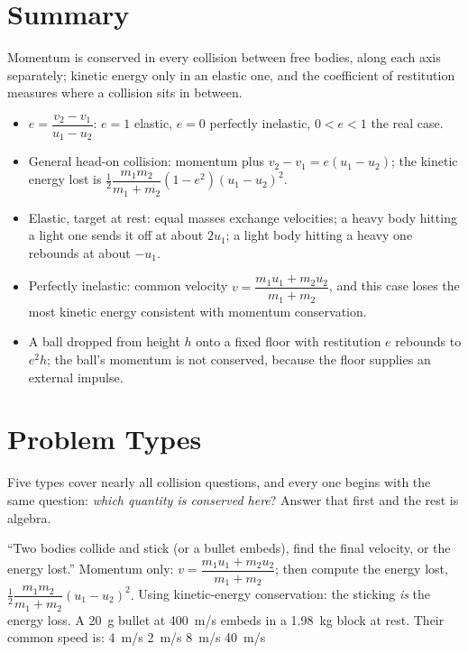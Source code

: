 \section{Summary}\label{sec:summary12}
Momentum is conserved in every collision between free bodies, along each axis separately; kinetic energy
only in an elastic one, and the coefficient of restitution measures where a collision sits in between.

\begin{itemize}
\item $e=\dfrac{v_2-v_1}{u_1-u_2}$: $e=1$ elastic, $e=0$ perfectly inelastic, $0<e<1$ the real case.
\item General head-on collision: momentum plus $v_2-v_1=e(u_1-u_2)$; the kinetic energy lost is
      $\tfrac12\dfrac{m_1m_2}{m_1+m_2}(1-e^2)(u_1-u_2)^2$.
\item Elastic, target at rest: equal masses exchange velocities; a heavy body hitting a light one sends it off
      at about $2u_1$; a light body hitting a heavy one rebounds at about $-u_1$.
\item Perfectly inelastic: common velocity $v=\dfrac{m_1u_1+m_2u_2}{m_1+m_2}$, and this case loses the most
      kinetic energy consistent with momentum conservation.
\item A ball dropped from height $h$ onto a fixed floor with restitution $e$ rebounds to $e^2h$; the ball's
      momentum is not conserved, because the floor supplies an external impulse.
\end{itemize}

\section{Problem Types}\label{sec:types12}
Five types cover nearly all collision questions, and every one begins with the same question:
\emph{which quantity is conserved here}? Answer that first and the rest is algebra.

{``Two bodies collide and stick (or a bullet embeds), find the final velocity, or the energy lost.''}
{Momentum only: $v=\dfrac{m_1u_1+m_2u_2}{m_1+m_2}$; then compute the energy lost,
$\tfrac12\dfrac{m_1m_2}{m_1+m_2}(u_1-u_2)^2$.}
{Using kinetic-energy conservation: the sticking \emph{is} the energy loss.}
{A \SI{20}{g} bullet at \SI{400}{m/s} embeds in a \SI{1.98}{kg} block at rest. Their common speed is:}
{\SI{4}{m/s}}
{\SI{2}{m/s}}
{\SI{8}{m/s}}
{\SI{40}{m/s}}

